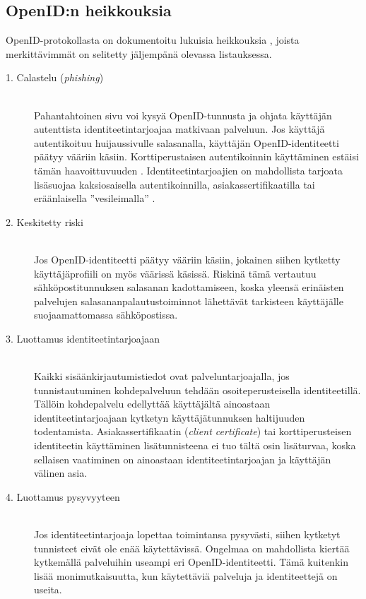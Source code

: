 \documentclass[english,gradu]{tktltiki}
\begin{document}
\subsection{OpenID:n heikkouksia}

OpenID-protokollasta on dokumentoitu lukuisia heikkouksia \cite{blackhat_openid_security_story, cameron_infocard_07, three_types_of_openid_ids_10}, joista merkittävimmät on selitetty jäljempänä olevassa listauksessa.

  \begin{description}

  \item[1. Calastelu (\emph{phishing})] \hfill \\
    Pahantahtoinen sivu voi kysyä OpenID-tunnusta ja ohjata käyttäjän autenttista identiteetintarjoajaa matkivaan palveluun. Jos käyttäjä autentikoituu huijaussivulle salasanalla, käyttäjän OpenID-identiteetti päätyy vääriin käsiin. Korttiperustaisen autentikoinnin käyttäminen estäisi tämän haavoittuvuuden \cite{cameron_infocard_07}. Identiteetintarjoajien on mahdollista tarjoata lisäsuojaa kaksiosaisella autentikoinnilla, asiakassertifikaatilla tai eräänlaisella ''vesileimalla'' \cite{yahoo_phishing_seal}.

   \item[2. Keskitetty riski] \hfill \\
      Jos OpenID-identiteetti päätyy vääriin käsiin, jokainen siihen kytketty käyttäjäprofiili on myös väärissä
      käsissä. Riskinä tämä vertautuu sähköpostitunnuksen salasanan kadottamiseen, koska yleensä erinäisten
      palvelujen salasananpalautustoiminnot lähettävät tarkisteen käyttäjälle suojaamattomassa sähköpostissa.

   \item[3. Luottamus identiteetintarjoajaan] \hfill \\
      Kaikki sisäänkirjautumistiedot ovat palveluntarjoajalla, jos tunnistautuminen kohdepalveluun tehdään
      osoiteperusteisella identiteetillä. Tällöin kohdepalvelu edellyttää käyttäjältä
      ainoastaan identiteetintarjoajaan kytketyn käyttäjätunnuksen haltijuuden todentamista.
      Asiakassertifikaatin (\emph{client certificate}) tai korttiperusteisen identiteetin käyttäminen
      lisätunnisteena ei tuo tältä osin lisäturvaa, koska sellaisen vaatiminen on ainoastaan
      identiteetintarjoajan ja käyttäjän välinen asia.

   \item[4. Luottamus pysyvyyteen] \hfill \\
      Jos identiteetintarjoaja lopettaa toimintansa pysyvästi, siihen kytketyt tunnisteet eivät ole enää
      käytettävissä. Ongelmaa on mahdollista kiertää kytkemällä palveluihin useampi eri OpenID-identiteetti.
      Tämä kuitenkin lisää monimutkaisuutta, kun käytettäviä palveluja ja identiteettejä on useita.


\end{description}
\end{document}
